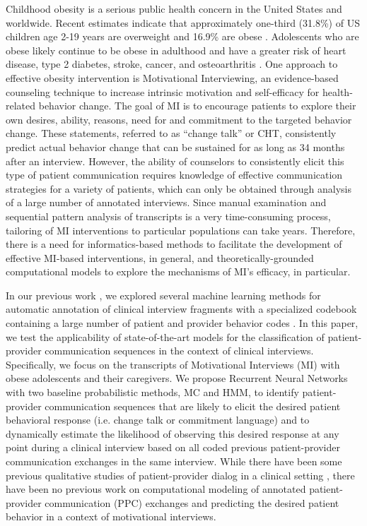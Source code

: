 \documentclass{amia_summit_2018}
\begin{document}
Childhood obesity is a serious public health concern in the United States and worldwide. Recent estimates indicate that approximately one-third (31.8\%) of US children age 2-19 years are overweight and 16.9\% are obese \cite{ogden2012prevalence}. Adolescents who are obese likely continue to be obese in adulthood and have a greater risk of heart disease, type 2 diabetes, stroke, cancer, and osteoarthritis \cite{general2010surgeon}. One approach to effective obesity intervention is Motivational Interviewing, an evidence-based counseling technique to increase intrinsic motivation and self-efficacy for health-related behavior change. The goal of MI is to encourage patients to explore their own desires, ability, reasons, need for and commitment to the targeted behavior change. These statements, referred to as ``change talk'' or CHT, consistently predict actual behavior change\cite{apodaca2009mechanisms} that can be sustained for as long as 34 months\cite{walker2011influence} after an interview. However, the ability of counselors to consistently elicit this type of patient communication requires knowledge of effective communication strategies for a variety of patients, which can only be obtained through analysis of a large number of annotated interviews. Since manual examination and sequential pattern analysis of transcripts is a very time-consuming process, tailoring of MI interventions to particular populations can take years. Therefore, there is a need for informatics-based methods to facilitate the development of effective MI-based interventions, in general, and theoretically-grounded computational models to explore the mechanisms of MI's efficacy, in particular.  

In our previous work \cite{kotov2015interpretable, hasan2016study}, we explored several machine learning methods for automatic annotation of clinical interview fragments with a specialized codebook containing a large number of patient and provider behavior codes \cite{carcone2013provider}. In this paper, we test the applicability of state-of-the-art models for the classification of patient-provider communication sequences in the context of clinical interviews. Specifically, we focus on the transcripts of Motivational Interviews (MI) with obese adolescents and their caregivers.
We propose Recurrent Neural Networks with two baseline probabilistic methods, MC and HMM, to identify patient-provider communication sequences that are likely to elicit the desired patient behavioral response (i.e. change talk or commitment language) and to dynamically estimate the likelihood of observing this desired response at any point during a clinical interview based on all coded previous patient-provider communication exchanges in the same interview. While there have been some previous qualitative studies of patient-provider dialog in a clinical setting \cite{eide2004physician}, there have been no previous work on computational modeling of annotated patient-provider communication (PPC) exchanges and predicting the desired patient behavior in a context of motivational interviews.   
\end{document}

